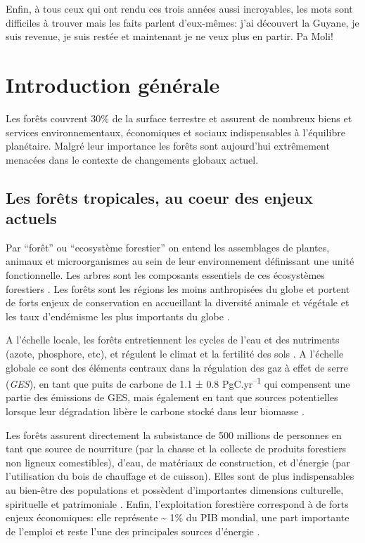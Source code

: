 \documentclass[
  11pt,
  french,
  A4paper,
  extrafontsizes,onecolumn,openright
  ]{memoir}
\begin{document}
Enfin, à tous ceux qui ont rendu ces trois années aussi incroyables, les
mots sont difficiles à trouver mais les faits parlent d'eux-mêmes: j'ai
découvert la Guyane, je suis revenue, je suis restée et maintenant je ne
veux plus en partir. Pa Moli!

\chapter{Introduction générale}\label{introduction-generale}

Les forêts couvrent 30\% de la surface terrestre et assurent de nombreux
biens et services environnementaux, économiques et sociaux
indispensables à l'équilibre planétaire. Malgré leur importance les
forêts sont aujourd'hui extrêmement menacées dans le contexte de
changements globaux actuel.

\section{Les forêts tropicales, au coeur des enjeux
actuels}\label{les-forets-tropicales-au-coeur-des-enjeux-actuels}

Par ``forêt'' ou ``ecosystème forestier'' on entend les assemblages de
plantes, animaux et microorganismes au sein de leur environnement
définissant une unité fonctionnelle. Les arbres sont les composants
essentiels de ces écosystèmes forestiers \autocite{FRA2000}. Les forêts
sont les régions les moins anthropisées du globe et portent de forts
enjeux de conservation en accueillant la diversité animale et végétale
et les taux d'endémisme les plus importants du globe
\autocites{Myers2000}{Mittermeier2003}.

A l'échelle locale, les forêts entretiennent les cycles de l'eau et des
nutriments (azote, phosphore, etc), et régulent le climat et la
fertilité des sols \autocites{Malhi2008}{Isbell2017}. A l'échelle
globale ce sont des éléments centraux dans la régulation des gaz à effet
de serre (\emph{GES}), en tant que puits de carbone de 1.1 ± 0.8
PgC.yr\textsuperscript{--1} qui compensent une partie des émissions de
GES, mais également en tant que sources potentielles lorsque leur
dégradation libère le carbone stocké dans leur biomasse
\autocites{Pan2011}{Roy2017}.

Les forêts assurent directement la subsistance de 500 millions de
personnes en tant que source de nourriture (par la chasse et la collecte
de produits forestiers non ligneux comestibles), d'eau, de matériaux de
construction, et d'énergie (par l'utilisation du bois de chauffage et de
cuisson). Elles sont de plus indispensables au bien-être des populations
et possèdent d'importantes dimensions culturelle, spirituelle et
patrimoniale \autocites{FRA2015}{Tilman2014}. Enfin, l'exploitation
forestière correspond à de forts enjeux économiques: elle représente
\textasciitilde{} 1\% du PIB mondial, une part importante de l'emploi et
reste l'une des principales sources d'énergie
\autocites{CBDdiversity2011}{FAO2014}.
\end{document}
